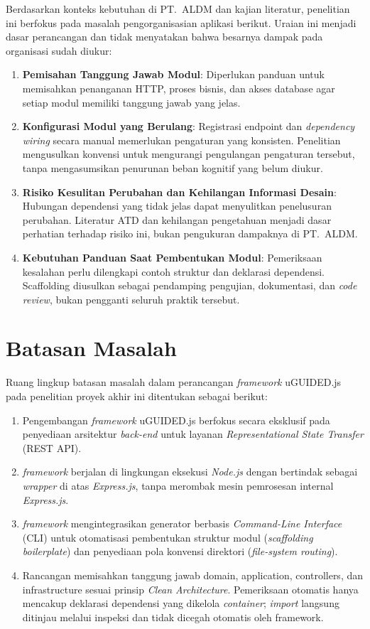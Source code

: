 \documentclass[12pt,a4paper,oneside]{report}
\begin{document}
Berdasarkan konteks kebutuhan di PT.\ ALDM dan kajian literatur, penelitian ini berfokus pada masalah pengorganisasian aplikasi berikut. Uraian ini menjadi dasar perancangan dan tidak menyatakan bahwa besarnya dampak pada organisasi sudah diukur:
\begin{enumerate}
\item \textbf{Pemisahan Tanggung Jawab Modul}: Diperlukan panduan untuk memisahkan penanganan HTTP, proses bisnis, dan akses database agar setiap modul memiliki tanggung jawab yang jelas.
\item \textbf{Konfigurasi Modul yang Berulang}: Registrasi endpoint dan \textit{dependency wiring} secara manual memerlukan pengaturan yang konsisten. Penelitian mengusulkan konvensi untuk mengurangi pengulangan pengaturan tersebut, tanpa mengasumsikan penurunan beban kognitif yang belum diukur.
\item \textbf{Risiko Kesulitan Perubahan dan Kehilangan Informasi Desain}: Hubungan dependensi yang tidak jelas dapat menyulitkan penelusuran perubahan. Literatur ATD dan kehilangan pengetahuan menjadi dasar perhatian terhadap risiko ini, bukan pengukuran dampaknya di PT.\ ALDM.
\item \textbf{Kebutuhan Panduan Saat Pembentukan Modul}: Pemeriksaan kesalahan perlu dilengkapi contoh struktur dan deklarasi dependensi. Scaffolding diusulkan sebagai pendamping pengujian, dokumentasi, dan \textit{code review}, bukan pengganti seluruh praktik tersebut.
\end{enumerate}

\section{Batasan Masalah}
\label{sec:batasan_masalah}

Ruang lingkup batasan masalah dalam perancangan \textit{framework} uGUIDED.js pada penelitian proyek akhir ini ditentukan sebagai berikut:
\begin{enumerate}
    \item Pengembangan \textit{framework} uGUIDED.js berfokus secara eksklusif pada penyediaan arsitektur \textit{back-end} untuk layanan \textit{Representational State Transfer} (REST API).
    \item \textit{framework} berjalan di lingkungan eksekusi \textit{Node.js} dengan bertindak sebagai \textit{wrapper} di atas \textit{Express.js}, tanpa merombak mesin pemrosesan internal \textit{Express.js}.
    \item \textit{framework} mengintegrasikan generator berbasis \textit{Command-Line Interface} (CLI) untuk otomatisasi pembentukan struktur modul (\textit{scaffolding boilerplate}) dan penyediaan pola konvensi direktori (\textit{file-system routing}).
    \item Rancangan memisahkan tanggung jawab domain, application, controllers, dan infrastructure sesuai prinsip \textit{Clean Architecture}. Pemeriksaan otomatis hanya mencakup deklarasi dependensi yang dikelola \textit{container}; \textit{import} langsung ditinjau melalui inspeksi dan tidak dicegah otomatis oleh framework.
\end{enumerate}
\end{document}

